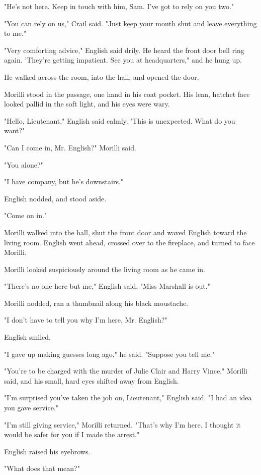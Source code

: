 \documentclass{novel}
\begin{document}
"He's not here. Keep in touch with him, Sam. I've got to rely on you two."

"You can rely on us," Crail said. "Just keep your mouth shut and leave everything to me."

"Very comforting advice," English said drily. He heard the front door bell ring again. 'They're getting impatient. See you at headquarters," and he hung up.

He walked across the room, into the hall, and opened the door.

Morilli stood in the passage, one hand in his coat pocket. His lean, hatchet face looked pallid in the soft light, and his eyes were wary.

"Hello, Lieutenant," English said calmly. 'This is unexpected. What do you want?"

"Can I come in, Mr. English?" Morilli said.

"You alone?"

"I have company, but he's downstairs."

English nodded, and stood aside.

"Come on in."

Morilli walked into the hall, shut the front door and waved English toward the living room. English went ahead, crossed over to the fireplace, and turned to face Morilli.

Morilli looked suspiciously around the living room as he came in.

"There's no one here but me," English said. "Miss Marshall is out."

Morilli nodded, ran a thumbnail along his black moustache.

"I don't have to tell you why I'm here, Mr. English?"

English smiled.

"I gave up making guesses long ago," he said. "Suppose you tell me."

"You're to be charged with the murder of Julie Clair and Harry Vince," Morilli said, and his small, hard eyes shifted away from English.

"I'm surprised you've taken the job on, Lieutenant," English said. "I had an idea you gave service."

"I'm still giving service," Morilli returned. "That's why I'm here. I thought it would be safer for you if I made the arrest."

English raised his eyebrows.

"What does that mean?"
\end{document}
